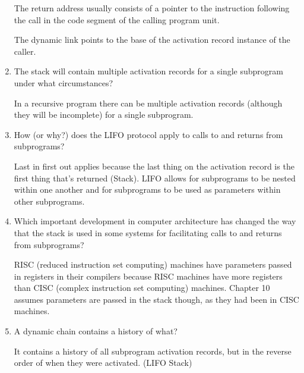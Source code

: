 \begin{enumerate}
  \begin{answer}

    The return address usually consists of a pointer to the instruction following the call in the code segment of the calling program unit. 

    The dynamic link points to the base of the activation record instance of the caller.

  \end{answer}

  \item The stack will contain multiple activation
    records for a single subprogram under what
    circumstances?

  \begin{answer}
    In a recursive program there can be multiple activation records (although they will be incomplete) for a single subprogram.
  \end{answer}

  \item How (or why?) does the LIFO protocol apply to
    calls to and returns from subprograms?

  \begin{answer}
    Last in first out applies because the last thing on the activation record is the first thing that's returned (Stack).  LIFO allows for subprograms to be nested within one another and for subprograms to be used as parameters within other subprograms.
  \end{answer}

  \item Which important development in computer architecture
    has changed the way that the stack is used in some
    systems for facilitating calls to and returns from
    subprograms?

  \begin{answer}
    RISC (reduced instruction set computing) machines have parameters passed in registers in their compilers because RISC machines have more registers than CISC (complex instruction set computing) machines. Chapter 10 assumes parameters are passed in the stack though, as they had been in CISC machines.
  \end{answer}

  \item A dynamic chain contains a history of what?

  \begin{answer}
    It contains a history of all subprogram activation records, but in the reverse order of when they were activated. (LIFO Stack)
  \end{answer}


\end{enumerate}

